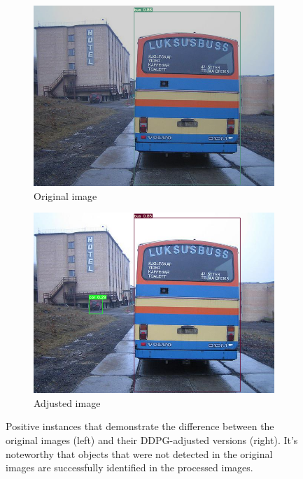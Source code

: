 \documentclass{PHlab-thesis}
\begin{document}
\begin{figure}[H]
    \begin{subfigure}{0.45\textwidth}
        \centering
        \includegraphics[width=\textwidth]{images/instances/original_image_3.png}
        \caption{Original image}
    \end{subfigure}
    \quad
    \begin{subfigure}{0.45\textwidth}
        \centering
        \includegraphics[width=\textwidth]{images/instances/adjusted_image_3.png}
        \caption{Adjusted image}
    \end{subfigure}
    \caption[Positive instances with DDPG adjustments]{Positive instances that demonstrate the difference between the original images (left) and their DDPG-adjusted versions (right). It's noteworthy that objects that were not detected in the original images are successfully identified in the processed images.}
\end{figure}
\end{document}
